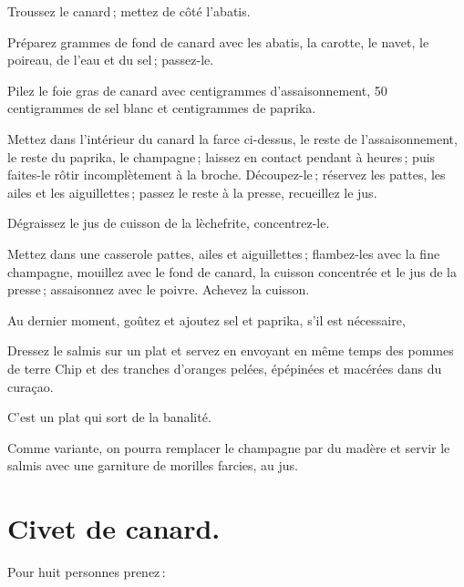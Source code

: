 Troussez le canard ; mettez de côté l'abatis.

Préparez {\mmm} grammes de fond de canard avec les abatis, la carotte, le navet, le
poireau, de l'eau et du sel ; passez-le.

Pilez le foie gras de canard avec {\mmm} centigrammes d'assaisonnement, 50
centigrammes de sel blanc et {\mmm} centigrammes de paprika.

Mettez dans l'intérieur du canard la farce ci-dessus, le reste de
l’assaisonnement, le reste du paprika, le champagne ; laissez en contact
pendant {\mmm} à {\mmm} heures ; puis faites-le rôtir incomplètement à la broche.
Découpez-le ; réservez les pattes, les ailes et les aiguillettes ; passez le
reste à la presse, recueillez le jus.

Dégraissez le jus de cuisson de la lèchefrite, concentrez-le.

Mettez dans une casserole pattes, ailes et aiguillettes ; flambez-les avec la
fine champagne, mouillez avec le fond de canard, la cuisson concentrée et le
jus de la presse ; assaisonnez avec le poivre. Achevez la cuisson.

Au dernier moment, goûtez et ajoutez sel et paprika, s'il est nécessaire,

Dressez le salmis sur un plat et servez en envoyant en même temps des pommes
de terre Chip et des tranches d'oranges pelées, épépinées et macérées dans du
curaçao.

C'est un plat qui sort de la banalité.

\sk

Comme variante, on pourra remplacer le champagne par du madère et servir le
salmis avec une garniture de morilles farcies, au jus.

\section*{\centering Civet de canard.}
{}

\label{pg0588} \hypertarget{p0588}{}

Pour huit personnes prenez :

